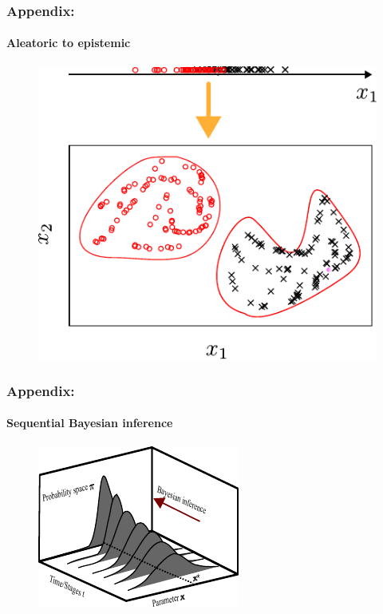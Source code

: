 \backupbegin

\begin{frame}
\frametitle{Appendix:}
\framesubtitle{Aleatoric to epistemic}
\begin{figure}[!ht]       \includegraphics[scale=1]{figures/figure-transform.pdf}
\end{figure}
    
\end{frame}
\begin{frame}
\frametitle{Appendix:}
\framesubtitle{Sequential Bayesian inference}
\begin{figure}[!ht]       \includegraphics[scale=2]{figures/figure-SBI.pdf}
\end{figure}
    
\end{frame}


